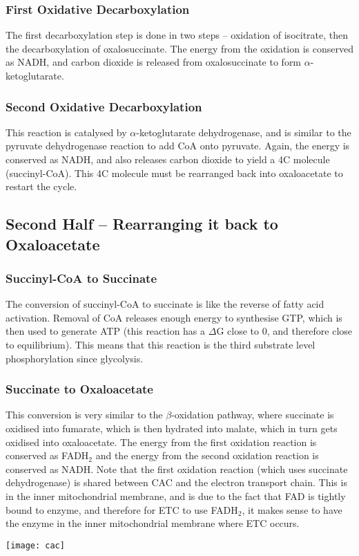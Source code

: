 \subsubsection{First Oxidative Decarboxylation}

The first decarboxylation step is done in two steps -- oxidation of isocitrate, then the decarboxylation of oxalosuccinate.
The energy from the oxidation is conserved as NADH, and carbon dioxide is released from oxalosuccinate to form $\alpha$-ketoglutarate.

\subsubsection{Second Oxidative Decarboxylation}

This reaction is catalysed by $\alpha$-ketoglutarate dehydrogenase, and is similar to the pyruvate dehydrogenase reaction to add CoA onto pyruvate.
Again, the energy is conserved as NADH, and also releases carbon dioxide to yield a 4C molecule (succinyl-CoA).
This 4C molecule must be rearranged back into oxaloacetate to restart the cycle.

\subsection{Second Half -- Rearranging it back to Oxaloacetate}

\subsubsection{Succinyl-CoA to Succinate}

The conversion of succinyl-CoA to succinate is like the reverse of fatty acid activation.
Removal of CoA releases enough energy to synthesise GTP, which is then used to generate ATP (this reaction has a $\Delta$G close to 0, and therefore close to equilibrium).
This means that this reaction is the third substrate level phosphorylation since glycolysis.

\subsubsection{Succinate to Oxaloacetate}

This conversion is very similar to the $\beta$-oxidation pathway, where succinate is oxidised into fumarate, which is then hydrated into malate, which in turn gets oxidised into oxaloacetate.
The energy from the first oxidation reaction is conserved as FADH$_2$ and the energy from the second oxidation reaction is conserved as NADH.
Note that the first oxidation reaction (which uses succinate dehydrogenase) is shared between CAC and the electron transport chain.
This is in the inner mitochondrial membrane, and is due to the fact that FAD is tightly bound to enzyme, and therefore for ETC to use FADH$_2$, it makes sense to have the enzyme in the inner mitochondrial membrane where ETC occurs.

\begin{center}
\texttt{[image: cac]}
\end{center}


